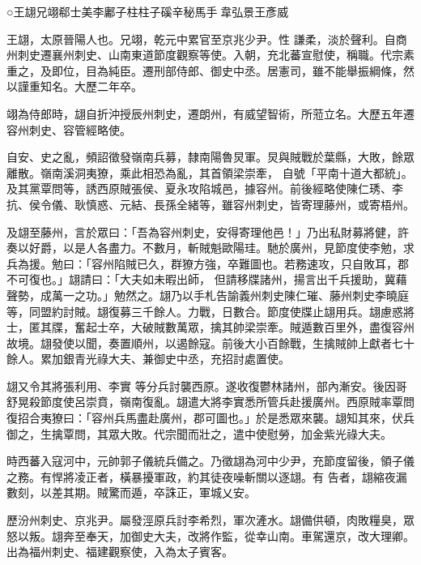 
\begin{pinyinscope}

 ○王翃兄翊郗士美李鄘子柱柱子磎辛秘馬手韋弘景王彥威



 王翃，太原晉陽人也。兄翊，乾元中累官至京兆少尹。性
 謙柔，淡於聲利。自商州刺史遷襄州刺史、山南東道節度觀察等使。入朝，充北蕃宣慰使，稱職。代宗素重之，及即位，目為純臣。遷刑部侍郎、御史中丞。居憲司，雖不能舉振綱條，然以謹重知名。大歷二年卒。



 翊為侍郎時，翃自折沖授辰州刺史，遷朗州，有威望智術，所蒞立名。大歷五年遷容州刺史、容管經略使。



 自安、史之亂，頻詔徵發嶺南兵募，隸南陽魯炅軍。炅與賊戰於葉縣，大敗，餘眾離散。嶺南溪洞夷獠，乘此相恐為亂，其首領梁崇牽，
 自號「平南十道大都統」。及其黨覃問等，誘西原賊張侯、夏永攻陷城邑，據容州。前後經略使陳仁琇、李抗、侯令儀、耿慎惑、元結、長孫全緒等，雖容州刺史，皆寄理藤州，或寄梧州。



 及翃至藤州，言於眾曰：「吾為容州刺史，安得寄理他邑！」乃出私財募將健，許奏以好爵，以是人各盡力。不數月，斬賊魁歐陽珪。馳於廣州，見節度使李勉，求兵為援。勉曰：「容州陷賊已久，群獠方強，卒難圖也。若務速攻，只自敗耳，郡不可復也。」翃請曰：「大夫如未暇出師，
 但請移牒諸州，揚言出千兵援助，冀藉聲勢，成萬一之功。」勉然之。翃乃以手札告諭義州刺史陳仁璀、藤州刺史李曉庭等，同盟約討賊。翃復募三千餘人。力戰，日數合。節度使牒止翃用兵。翃慮惑將士，匿其牒，奮起士卒，大破賊數萬眾，擒其帥梁崇牽。賊遁數百里外，盡復容州故境。翃發使以聞，奏置順州，以遏餘寇。前後大小百餘戰，生擒賊帥上獻者七十餘人。累加銀青光祿大夫、兼御史中丞，充招討處置使。



 翃又令其將張利用、李實
 等分兵討襲西原。遂收復鬱林諸州，部內漸安。後因哥舒晃殺節度使呂崇賁，嶺南復亂。翃遣大將李實悉所管兵赴援廣州。西原賊率覃問復招合夷獠曰：「容州兵馬盡赴廣州，郡可圖也。」於是悉眾來襲。翃知其來，伏兵御之，生擒覃問，其眾大敗。代宗聞而壯之，遣中使慰勞，加金紫光祿大夫。



 時西蕃入寇河中，元帥郭子儀統兵備之。乃徵翃為河中少尹，充節度留後，領子儀之務。有悍將凌正者，橫暴擾軍政，約其徒夜噪斬關以逐翃。有
 告者，翃縮夜漏數刻，以差其期。賊驚而遁，卒誅正，軍城乂安。



 歷汾州刺史、京兆尹。屬發涇原兵討李希烈，軍次滻水。翃備供頓，肉敗糧臭，眾怒以叛。翃奔至奉天，加御史大夫，改將作監，從幸山南。車駕還京，改大理卿。出為福州刺史、福建觀察使，入為太子賓客。




\end{pinyinscope}
